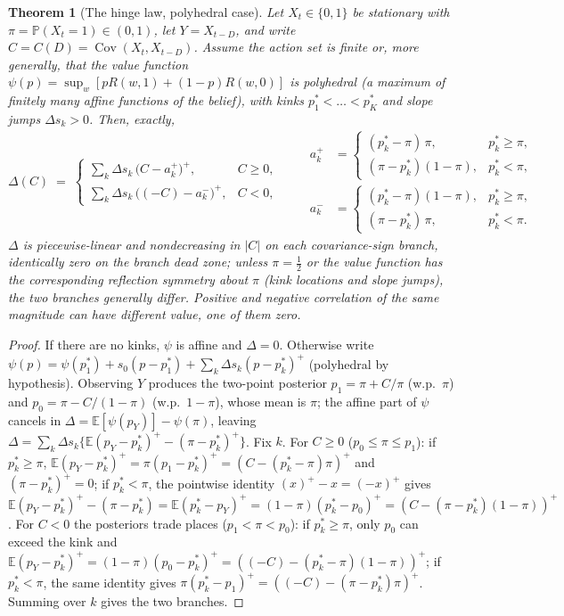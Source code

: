 \documentclass[11pt]{article}
\newtheorem{theorem}{Theorem}
\newcommand{\E}{\mathbb{E}}
\begin{document}
\begin{theorem}[The hinge law, polyhedral case]\label{thm:hinge}
Let $X_t\in\{0,1\}$ be stationary with $\pi=\mathbb P(X_t{=}1)\in(0,1)$, let
$Y=X_{t-D}$, and write $C=C(D)=\operatorname{Cov}(X_t,X_{t-D})$. Assume the
action set is finite or, more generally, that the value function
$\psi(p)=\sup_w[pR(w,1)+(1-p)R(w,0)]$ is \emph{polyhedral} (a maximum of
finitely many affine functions of the belief), with kinks
$p^*_1<\dots<p^*_K$ and slope jumps $\Delta s_k>0$. Then, exactly,
\[
\Delta(C)\;=\;
\begin{cases}
\displaystyle\sum_{k}\Delta s_k\,\bigl(C-a^+_k\bigr)^{\!+}, & C\ge 0,\\[6pt]
\displaystyle\sum_{k}\Delta s_k\,\bigl((-C)-a^-_k\bigr)^{\!+}, & C< 0,
\end{cases}
\qquad
\begin{aligned}
a^+_k&=\begin{cases}(p^*_k-\pi)\,\pi, & p^*_k\ge\pi,\\
(\pi-p^*_k)(1-\pi), & p^*_k<\pi,\end{cases}\\
a^-_k&=\begin{cases}(p^*_k-\pi)(1-\pi), & p^*_k\ge\pi,\\
(\pi-p^*_k)\,\pi, & p^*_k<\pi.\end{cases}
\end{aligned}
\]
$\Delta$ is piecewise-linear and nondecreasing in $|C|$ \emph{on each
covariance-sign branch}, identically zero on the branch dead zone; unless
$\pi=\tfrac12$ or the value function has the corresponding reflection
symmetry about $\pi$ (kink locations \emph{and} slope jumps), the two
branches generally differ. Positive and negative correlation of the
same magnitude can have different value, one of them zero.
\end{theorem}

\begin{proof}
If there are no kinks, $\psi$ is affine and $\Delta=0$. Otherwise write
$\psi(p)=\psi(p^*_1)+s_0(p-p^*_1)+\sum_k\Delta s_k (p-p^*_k)^+$
(polyhedral by hypothesis). Observing
$Y$ produces the two-point posterior $p_1=\pi+C/\pi$ (w.p.\ $\pi$) and
$p_0=\pi-C/(1-\pi)$ (w.p.\ $1-\pi$), whose mean is $\pi$; the affine part
of $\psi$ cancels in $\Delta=\E[\psi(p_Y)]-\psi(\pi)$, leaving
$\Delta=\sum_k\Delta s_k\{\E(p_Y-p^*_k)^+-(\pi-p^*_k)^+\}$. Fix $k$. For
$C\ge0$ ($p_0\le\pi\le p_1$): if $p^*_k\ge\pi$,
$\E(p_Y-p^*_k)^+=\pi(p_1-p^*_k)^+=(C-(p^*_k-\pi)\pi)^+$ and
$(\pi-p^*_k)^+=0$; if $p^*_k<\pi$, the pointwise identity $(x)^+-x=(-x)^+$
gives $\E(p_Y-p^*_k)^+-(\pi-p^*_k)=\E(p^*_k-p_Y)^+
=(1-\pi)(p^*_k-p_0)^+=(C-(\pi-p^*_k)(1-\pi))^+$. For $C<0$ the posteriors
trade places ($p_1<\pi<p_0$): if $p^*_k\ge\pi$, only $p_0$ can exceed the
kink and $\E(p_Y-p^*_k)^+=(1-\pi)(p_0-p^*_k)^+=((-C)-(p^*_k-\pi)(1-\pi))^+$;
if $p^*_k<\pi$, the same identity gives
$\pi(p^*_k-p_1)^+=((-C)-(\pi-p^*_k)\pi)^+$. Summing over $k$ gives the two
branches.
\end{proof}
\end{document}

